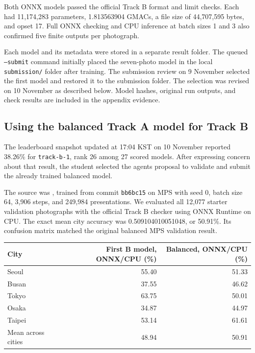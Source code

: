 \documentclass[11pt]{article}
\begin{document}
Both ONNX models passed the official Track B format and limit checks. Each
had 11,174,283 parameters, 1.813563904 GMACs, a file size of 44,707,595 bytes,
and opset 17. Full ONNX checking and CPU inference at batch sizes 1 and 3
also confirmed five finite outputs per photograph.

Each model and its metadata were stored in a separate result folder. The
queued \texttt{--submit} command initially placed the seven-photo model in
the local \texttt{submission/} folder after training. The submission review
on 9 November selected the first model and restored it to the submission
folder. The selection was revised on 10 November as described below.
Model hashes, original run outputs, and check results are included in the
appendix evidence.

\subsection{Using the balanced Track A model for Track B}

The leaderboard snapshot updated at 17:04 KST on 10 November reported
38.26\% for \texttt{track-b-1}, rank 26 among 27 scored models. After
expressing concern about that result, the student selected the agent\textquotesingle{}s
proposal to validate and submit the already trained balanced model.

The source was , trained from
commit \texttt{bb6bc15} on MPS with seed 0, batch size 64, 3,906 steps,
and 249,984 presentations. We evaluated all 12,077 starter validation
photographs with the official Track B checker using ONNX Runtime on CPU.
The exact mean city accuracy was 0.509104010051048, or 50.91\%.
Its confusion matrix matched the original balanced MPS validation result.

\begin{center}\small
\begin{tabular}{lrr}
\toprule
City & First B model, ONNX/CPU (\%) & Balanced, ONNX/CPU (\%) \\
\midrule
Seoul & 55.40 & 51.33 \\
Busan & 37.55 & 46.62 \\
Tokyo & 63.75 & 50.01 \\
Osaka & 34.87 & 44.97 \\
Taipei & 53.14 & 61.61 \\
\midrule
Mean across cities & 48.94 & 50.91 \\
\bottomrule
\end{tabular}
\end{center}
\end{document}
